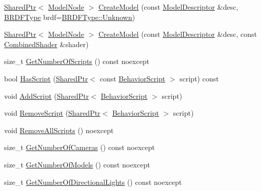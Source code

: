 \begin{DoxyCompactItemize}
\item 
\hyperlink{namespacemage_a1e01ae66713838a7a67d30e44c67703e}{Shared\+Ptr}$<$ \hyperlink{classmage_1_1_model_node}{Model\+Node} $>$ \hyperlink{classmage_1_1_scene_a7eba7406c98dab775b09b9e5f466578f}{Create\+Model} (const \hyperlink{classmage_1_1_model_descriptor}{Model\+Descriptor} \&desc, \hyperlink{namespacemage_ae7a7a03a7b34d7e2689689bb8295cd38}{B\+R\+D\+F\+Type} brdf=\hyperlink{namespacemage_ae7a7a03a7b34d7e2689689bb8295cd38a88183b946cc5f0e8c96b2e66e1c74a7e}{B\+R\+D\+F\+Type\+::\+Unknown})
\item 
\hyperlink{namespacemage_a1e01ae66713838a7a67d30e44c67703e}{Shared\+Ptr}$<$ \hyperlink{classmage_1_1_model_node}{Model\+Node} $>$ \hyperlink{classmage_1_1_scene_acec24d6be33387814c6022de7ce9de0e}{Create\+Model} (const \hyperlink{classmage_1_1_model_descriptor}{Model\+Descriptor} \&desc, const \hyperlink{structmage_1_1_combined_shader}{Combined\+Shader} \&shader)
\item 
size\+\_\+t \hyperlink{classmage_1_1_scene_a33cecd2fd2b393ccac84b94ec8cc53c0}{Get\+Number\+Of\+Scripts} () const noexcept
\item 
bool \hyperlink{classmage_1_1_scene_a9dd6c49e9db7590de1de4fbd128c78a9}{Has\+Script} (\hyperlink{namespacemage_a1e01ae66713838a7a67d30e44c67703e}{Shared\+Ptr}$<$ const \hyperlink{classmage_1_1_behavior_script}{Behavior\+Script} $>$ script) const
\item 
void \hyperlink{classmage_1_1_scene_ab97b66c81c32681699052e154d0e0722}{Add\+Script} (\hyperlink{namespacemage_a1e01ae66713838a7a67d30e44c67703e}{Shared\+Ptr}$<$ \hyperlink{classmage_1_1_behavior_script}{Behavior\+Script} $>$ script)
\item 
void \hyperlink{classmage_1_1_scene_a82705ba56543dea410439760b1667bc5}{Remove\+Script} (\hyperlink{namespacemage_a1e01ae66713838a7a67d30e44c67703e}{Shared\+Ptr}$<$ \hyperlink{classmage_1_1_behavior_script}{Behavior\+Script} $>$ script)
\item 
void \hyperlink{classmage_1_1_scene_af610ef656fa46cb88638f1356ecee6a8}{Remove\+All\+Scripts} () noexcept
\item 
size\+\_\+t \hyperlink{classmage_1_1_scene_a7b0a49510128a1e9dbc64a657fe9ec7a}{Get\+Number\+Of\+Cameras} () const noexcept
\item 
size\+\_\+t \hyperlink{classmage_1_1_scene_aa5092da49a901a02802d7f1532b75210}{Get\+Number\+Of\+Models} () const noexcept
\item 
size\+\_\+t \hyperlink{classmage_1_1_scene_afd3b87bc2e2212890ff4c7a761c29684}{Get\+Number\+Of\+Directional\+Lights} () const noexcept

\end{DoxyCompactItemize}
